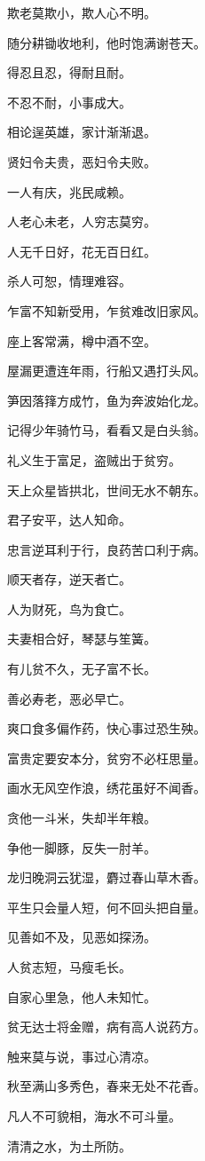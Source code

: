 \documentclass[12pt,oneside]{book}
\begin{document}
欺老莫欺小，欺人心不明。

随分耕锄收地利，他时饱满谢苍天。

得忍且忍，得耐且耐。

不忍不耐，小事成大。

相论逞英雄，家计渐渐退。

贤妇令夫贵，恶妇令夫败。

一人有庆，兆民咸赖。

人老心未老，人穷志莫穷。

人无千日好，花无百日红。

杀人可恕，情理难容。

乍富不知新受用，乍贫难改旧家风。

座上客常满，樽中酒不空。

屋漏更遭连年雨，行船又遇打头风。

笋因落箨方成竹，鱼为奔波始化龙。

记得少年骑竹马，看看又是白头翁。

礼义生于富足，盗贼出于贫穷。

天上众星皆拱北，世间无水不朝东。

君子安平，达人知命。

忠言逆耳利于行，良药苦口利于病。

顺天者存，逆天者亡。

人为财死，鸟为食亡。

夫妻相合好，琴瑟与笙簧。

有儿贫不久，无子富不长。

善必寿老，恶必早亡。

爽口食多偏作药，快心事过恐生殃。

富贵定要安本分，贫穷不必枉思量。

画水无风空作浪，绣花虽好不闻香。

贪他一斗米，失却半年粮。

争他一脚豚，反失一肘羊。

龙归晚洞云犹湿，麝过春山草木香。

平生只会量人短，何不回头把自量。

见善如不及，见恶如探汤。

人贫志短，马瘦毛长。

自家心里急，他人未知忙。

贫无达士将金赠，病有高人说药方。

触来莫与说，事过心清凉。

秋至满山多秀色，春来无处不花香。

凡人不可貌相，海水不可斗量。

清清之水，为土所防。
\end{document}

